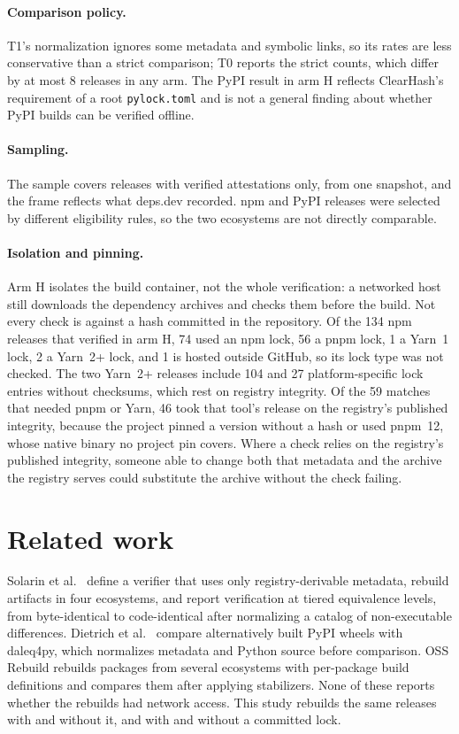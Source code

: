 \documentclass[11pt]{article}
\begin{document}
\paragraph{Comparison policy.} T1's normalization ignores some metadata
and symbolic links, so its rates are less conservative than a strict
comparison; T0 reports the strict counts, which differ by at most 8
releases in any arm. The PyPI result in arm H reflects ClearHash's
requirement of a root \texttt{pylock.toml} and is not a general finding
about whether PyPI builds can be verified offline.

\paragraph{Sampling.} The sample covers releases with verified
attestations only, from one snapshot, and the frame reflects what deps.dev
recorded. npm and PyPI releases were selected by different eligibility
rules, so the two ecosystems are not directly comparable.

\paragraph{Isolation and pinning.} Arm H isolates the build container,
not the whole verification: a networked host still downloads the
dependency archives and checks them before the build. Not every check is
against a hash committed in the repository. Of the 134 npm releases that
verified in arm H, 74 used an npm lock, 56 a pnpm lock, 1 a Yarn~1 lock,
2 a Yarn~2+ lock, and 1 is hosted outside GitHub, so its lock type was
not checked. The two Yarn~2+ releases include
104 and 27 platform-specific lock entries without checksums, which rest
on registry integrity. Of the 59 matches that needed pnpm or Yarn, 46
took that tool's release on the registry's published integrity, because
the project pinned a version without a hash or used pnpm~12, whose native
binary no project pin covers. Where a check relies on the registry's
published integrity, someone able to change both that metadata and the
archive the registry serves could substitute the archive without the
check failing.

\section{Related work}

Solarin et al.\ \cite{solarin2026} define a verifier that uses only
registry-derivable metadata, rebuild artifacts in four ecosystems, and
report verification at tiered equivalence levels, from byte-identical to
code-identical after normalizing a catalog of non-executable differences.
Dietrich et al.\ \cite{dietrich2026} compare alternatively built PyPI
wheels with daleq4py, which normalizes metadata and Python source before
comparison. OSS Rebuild \cite{ossrebuild} rebuilds packages from several
ecosystems with per-package build definitions and compares them after
applying stabilizers. None of these reports whether the rebuilds had
network access. This study rebuilds the same releases with and without
it, and with and without a committed lock.
\end{document}
